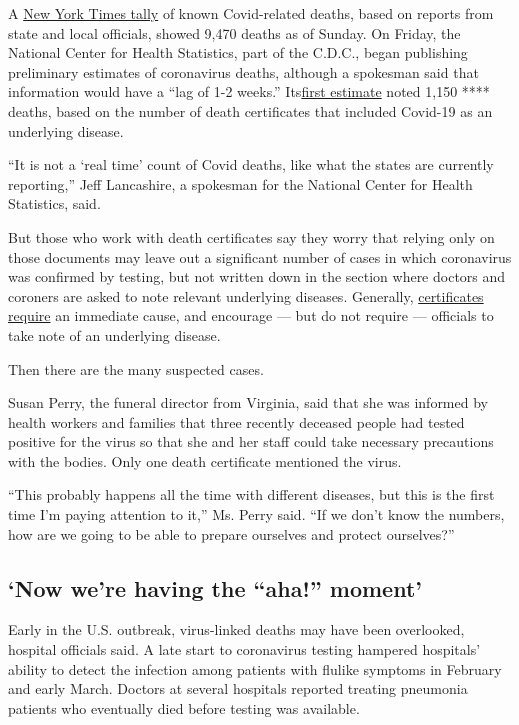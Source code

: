 A
\href{https://www.nytimes.com/interactive/2020/us/coronavirus-us-cases.html}{New
York Times tally} of known Covid-related deaths, based on reports from
state and local officials, showed 9,470 deaths as of Sunday. On Friday,
the National Center for Health Statistics, part of the C.D.C., began
publishing preliminary estimates of coronavirus deaths, although a
spokesman said that information would have a ``lag of 1-2 weeks.''
Its\href{https://www.cdc.gov/nchs/nvss/vsrr/COVID19/}{first estimate}
noted 1,150 **** deaths, based on the number of death certificates that
included Covid-19 as an underlying disease.

``It is not a `real time' count of Covid deaths, like what the states
are currently reporting,'' Jeff Lancashire, a spokesman for the National
Center for Health Statistics, said.

But those who work with death certificates say they worry that relying
only on those documents may leave out a significant number of cases in
which coronavirus was confirmed by testing, but not written down in the
section where doctors and coroners are asked to note relevant underlying
diseases. Generally,
\href{https://www.cdc.gov/nchs/data/dvs/blue_form.pdf}{certificates
require} an immediate cause, and encourage --- but do not require ---
officials to take note of an underlying disease.

Then there are the many suspected cases.

Susan Perry, the funeral director from Virginia, said that she was
informed by health workers and families that three recently deceased
people had tested positive for the virus so that she and her staff could
take necessary precautions with the bodies. Only one death certificate
mentioned the virus.

``This probably happens all the time with different diseases, but this
is the first time I'm paying attention to it,'' Ms. Perry said. ``If we
don't know the numbers, how are we going to be able to prepare ourselves
and protect ourselves?''

\hypertarget{now-were-having-the-aha-moment}{%
\subsection{`Now we're having the ``aha!''
moment'}\label{now-were-having-the-aha-moment}}

Early in the U.S. outbreak, virus-linked deaths may have been
overlooked, hospital officials said. A late start to coronavirus testing
hampered hospitals' ability to detect the infection among patients with
flulike symptoms in February and early March. Doctors at several
hospitals reported treating pneumonia patients who eventually died
before testing was available.

